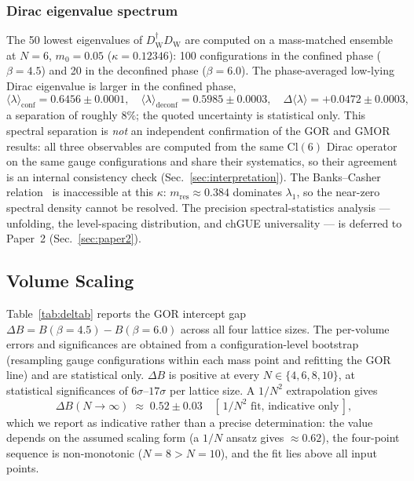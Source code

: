 \documentclass[12pt]{article}
\newcommand{\cl}{\mathrm{Cl}}          %
\newcommand{\dW}{D_{\mathrm{W}}}       %
\begin{document}
\subsubsection{Dirac eigenvalue spectrum}
\label{sec:dirac-spec}

The 50 lowest eigenvalues of $\dW^\dagger\dW$ are computed on a
mass-matched ensemble at $N=6$, $m_0=0.05$ ($\kappa=0.12346$): 100
configurations in the confined phase ($\beta=4.5$) and 20 in the
deconfined phase ($\beta=6.0$).  The phase-averaged low-lying Dirac
eigenvalue is larger in the confined phase,
\begin{equation}
  \langle\lambda\rangle_{\text{conf}} = 0.6456\pm0.0001, \quad
  \langle\lambda\rangle_{\text{deconf}} = 0.5985\pm0.0003, \quad
  \Delta\langle\lambda\rangle = +0.0472\pm0.0003,
  \label{eq:spec-mean}
\end{equation}
a separation of roughly $8\%$; the quoted uncertainty is statistical
only.  This spectral separation is \emph{not} an independent
confirmation of the GOR and GMOR results: all three observables are
computed from the same $\cl(6)$ Dirac operator on the same gauge
configurations and share their systematics, so their agreement is an
internal consistency check (Sec.~\ref{sec:interpretation}).  The
Banks--Casher relation~\cite{Banks1980} is inaccessible at this
$\kappa$: $m_{\mathrm{res}}\approx0.384$ dominates $\lambda_1$, so the
near-zero spectral density cannot be resolved.  The precision
spectral-statistics analysis --- unfolding, the level-spacing
distribution, and chGUE universality --- is deferred to Paper~2
(Sec.~\ref{sec:paper2}).

\subsection{Volume Scaling}
\label{sec:volume}

Table~\ref{tab:deltab} reports the GOR intercept gap
$\Delta B = B(\beta=4.5)-B(\beta=6.0)$ across all four lattice sizes.
The per-volume errors and significances are obtained from a
configuration-level bootstrap (resampling gauge configurations within
each mass point and refitting the GOR line) and are statistical only.
$\Delta B$ is positive at every $N\in\{4,6,8,10\}$, at statistical
significances of $6\sigma$--$17\sigma$ per lattice size.  A $1/N^2$
extrapolation gives
\begin{equation}
  \Delta B(N\to\infty) \;\approx\; 0.52\pm0.03
  \quad [\,1/N^2\text{ fit, indicative only}\,],
  \label{eq:delta-b}
\end{equation}
which we report as indicative rather than a precise determination: the
value depends on the assumed scaling form (a $1/N$ ansatz gives
$\approx0.62$), the four-point sequence is non-monotonic ($N=8>N=10$),
and the fit lies above all input points.
\end{document}
